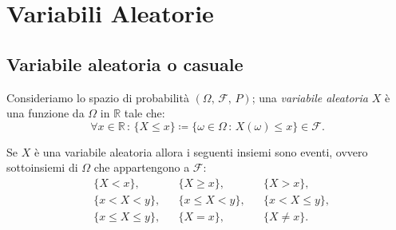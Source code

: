
\chapter{Variabili Aleatorie}
    \section{Variabile aleatoria o casuale}
        \begin{defn}\label{defn:Variabile_aleatoria}
            Consideriamo lo spazio di probabilità $(\Omega,\,\mathscr{F},\,P)$; una \textit{variabile aleatoria} $X$ è una funzione da $\Omega$ in $\mathbb{R}$ tale che: \[
                \forall x \in \mathbb{R} \,:\, \{X \leq x\} \coloneqq \{\omega \in \Omega \,:\, X(\omega) \leq x\} \in \mathscr{F}
            .\]
        \end{defn}
        \begin{prty}\label{prty:Variabile_aleatoria}
            Se $X$ è una variabile aleatoria allora i seguenti insiemi sono eventi, ovvero sottoinsiemi di $\Omega$ che appartengono a $\mathscr{F}$:
            \begin{align*}
                &\{X < x\}, & &\{X \geq x\}, & &\{X > x\}, \\
                &\{x < X < y\}, & &\{x \leq X < y\}, & &\{x < X \leq y\}, \\
                &\{x \leq X \leq y\}, & &\{X = x\}, & &\{X \neq x\}
            .\end{align*}
        \end{prty}

